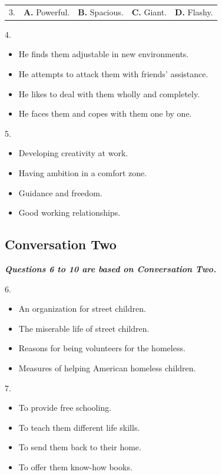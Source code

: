 \documentclass[UTF8,11pt]{ctexart}
\begin{document}
\noindent\begin{tabularx}{\linewidth}{@{}lXXXX@{}}3. & \textbf{A.} Powerful. & \textbf{B.} Spacious. & \textbf{C.} Giant. & \textbf{D.} Flashy.\\\end{tabularx}\par

4.


\begin{itemize}[leftmargin=2em,itemsep=.2em,topsep=.4em]\item[A.] He finds them adjustable in new environments.
\item[B.] He attempts to attack them with friends’ assistance.
\item[C.] He likes to deal with them wholly and completely.
\item[D.] He faces them and copes with them one by one.
\end{itemize}

5.


\begin{itemize}[leftmargin=2em,itemsep=.2em,topsep=.4em]\item[A.] Developing creativity at work.
\item[B.] Having ambition in a comfort zone.
\item[C.] Guidance and freedom.
\item[D.] Good working relationships.
\end{itemize}

\subsection*{\textbf{Conversation Two}}


\textbf{\textit{Questions 6 to 10 are based on Conversation Two.}}


6.


\begin{itemize}[leftmargin=2em,itemsep=.2em,topsep=.4em]\item[A.] An organization for street children.
\item[B.] The miserable life of street children.
\item[C.] Reasons for being volunteers for the homeless.
\item[D.] Measures of helping American homeless children.
\end{itemize}

7.


\begin{itemize}[leftmargin=2em,itemsep=.2em,topsep=.4em]\item[A.] To provide free schooling.
\item[B.] To teach them different life skills.
\item[C.] To send them back to their home.
\item[D.] To offer them know-how books.
\end{itemize}
\end{document}
